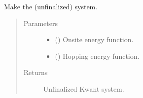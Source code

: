 \documentclass[letterpaper,10pt,english]{sphinxmanual}
\begin{document}
\begin{fulllineitems}
\begin{fulllineitems}
\label{\detokenize{modules:modules.system.Device.make_system}}
\pysigstartsignatures
{}
\pysigstopsignatures
\sphinxAtStartPar
Make the (unfinalized) system.
\begin{quote}\begin{description}
\item[{Parameters}] \leavevmode\begin{itemize}
\item {} 
\sphinxAtStartPar
{} () \textendash{} Onsite energy function.

\item {} 
\sphinxAtStartPar
{} () \textendash{} Hopping energy function.

\end{itemize}

\item[{Returns}] \leavevmode
\sphinxAtStartPar
Unfinalized Kwant system.

\end{description}\end{quote}

\end{fulllineitems}


\end{fulllineitems}

\end{document}
